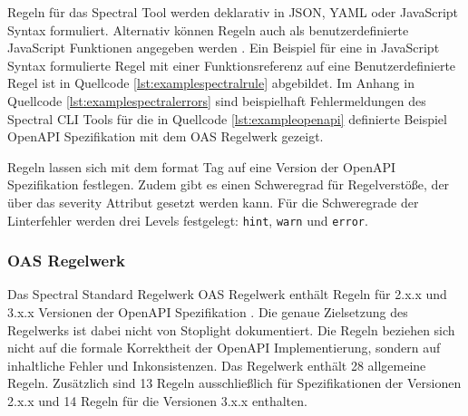 Regeln für das Spectral Tool werden deklarativ in \acs{JSON}, \acs{YAML} oder JavaScript Syntax formuliert. Alternativ können Regeln auch als benutzerdefinierte JavaScript Funktionen angegeben werden \parencite{bogner_restruler_2024}. Ein Beispiel für eine in JavaScript Syntax formulierte Regel mit einer Funktionsreferenz auf eine Benutzerdefinierte Regel ist in Quellcode \ref{lst:examplespectralrule} abgebildet. Im Anhang in Quellcode \ref{lst:examplespectralerrors} sind beispielhaft Fehlermeldungen des Spectral CLI Tools für die in Quellcode \ref{lst:exampleopenapi} definierte Beispiel OpenAPI Spezifikation mit dem \acs{OAS} Regelwerk gezeigt.

Regeln lassen sich mit dem format Tag auf eine Version der OpenAPI Spezifikation festlegen. Zudem gibt es einen Schweregrad für Regelverstöße, der über das severity Attribut gesetzt werden kann. Für die Schweregrade der Linterfehler werden drei Levels festgelegt: \texttt{hint}, \texttt{warn} und \texttt{error}.

\subsubsection{OAS Regelwerk} \label{sec:oasregelwerk}

Das Spectral Standard Regelwerk OAS Regelwerk enthält Regeln für 2.x.x und 3.x.x Versionen der OpenAPI Spezifikation \parencite{stoplight_spectral_2024}. Die genaue Zielsetzung des Regelwerks ist dabei nicht von Stoplight dokumentiert. Die Regeln beziehen sich nicht auf die formale Korrektheit der OpenAPI Implementierung, sondern auf inhaltliche Fehler und Inkonsistenzen. Das Regelwerk enthält 28 allgemeine Regeln. Zusätzlich sind 13 Regeln ausschließlich für Spezifikationen der Versionen 2.x.x und 14 Regeln für die Versionen 3.x.x enthalten.

